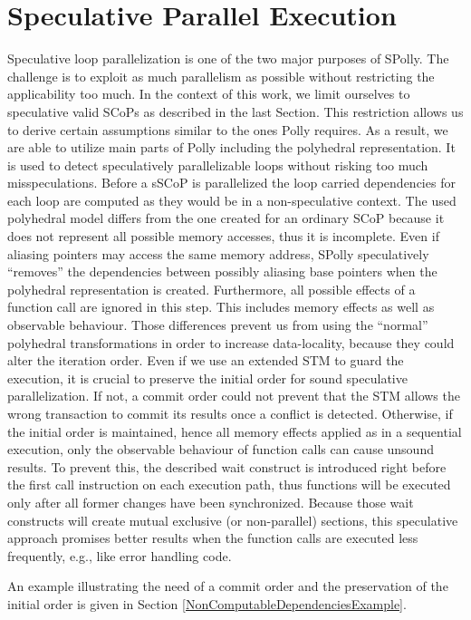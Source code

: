 \section{Speculative Parallel Execution}
\label{SpeculativeParallelExecution}
Speculative loop parallelization is one of the two major purposes of 
SPolly. The challenge is to exploit as much parallelism as possible 
without restricting the applicability too much. In the context of this work, 
we limit ourselves to speculative valid SCoPs as described in the last Section. 
This restriction allows us to derive certain assumptions similar to the ones 
Polly requires. As a result, we are able to utilize main parts of Polly including 
the polyhedral representation. It is used to detect speculatively parallelizable loops 
without risking too much misspeculations. 
Before a sSCoP is parallelized the loop carried dependencies for each loop 
are computed as they would be in a non-speculative context.
The used polyhedral model differs from the one
created for an ordinary SCoP because it does not represent all possible memory accesses,
thus it is incomplete.
Even if aliasing pointers may access the same memory address, SPolly 
speculatively ``removes'' the dependencies between possibly aliasing base pointers
when the polyhedral representation is created. Furthermore, all possible effects
of a function call are ignored in this step. This includes
memory effects as well as observable behaviour.
Those differences prevent us from using the ``normal'' polyhedral transformations 
in order to increase data-locality, because they could alter the iteration order.
Even if we use an extended STM to guard the execution, it is crucial to preserve
the initial order for sound speculative parallelization. If not,
a commit order could not prevent that the STM allows the wrong 
transaction to commit its results once a conflict is detected. Otherwise, if
the initial order is maintained, hence all memory effects applied as in a sequential 
execution, only the observable behaviour of function calls 
can cause unsound results. To prevent this, the described wait construct 
is introduced right before the first call instruction on each execution path, 
thus functions will be executed only after all former changes have been 
synchronized. Because those wait constructs will create
mutual exclusive (or non-parallel) sections, this speculative approach promises 
better results when the function calls are executed less frequently, e.g., like
error handling code. 

An example illustrating the need of a commit order and the preservation of the 
initial order is given in Section \ref{NonComputableDependenciesExample}.


